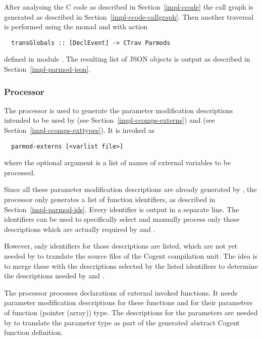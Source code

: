 After analysing the C code as described in Section~\ref{impl-ccode} the call graph is generated as described
in Section~\ref{impl-ccode-callgraph}. Then another traversal is performed using the  monad and
 with action
\begin{verbatim}
  transGlobals :: [DeclEvent] -> CTrav Parmods
\end{verbatim}
defined in module . The resulting list of JSON objects is output as described 
in Section~\ref{impl-parmod-json}.

\subsubsection{Processor }

The processor  is used to generate the parameter modification descriptions intended
to be used by  (see Section~\ref{impl-ccomps-externs}) and  
(see Section~\ref{impl-ccomps-exttypes}). It is invoked as
\begin{verbatim}
  parmod-externs [<varlist file>]
\end{verbatim}
where the optional argument is a list of names of external variables to be processed.

Since all these parameter modification descriptions are already
generated by , the processor only generates a list of function identifiers, as described in 
Section~\ref{impl-parmod-ids}. Every identifier is output in a separate line. The identifiers can be used
to specifically select and manually process only those descriptions which are actually required by
 and . 

However, only identifiers for those descriptions are listed,
which are not yet needed by  to translate the source files of the Cogent compilation unit.
The idea is to merge these with the descriptions selected by the listed identifiers to determine the 
descriptions needed by  and .

The processor  processes declarations of external invoked functions. It needs parameter
modification descriptions for these functions and for their parameters of function (pointer (array)) type.
The descriptions for the parameters are needed by  to translate the parameter type as part of the 
generated abstract Cogent function definition. 


